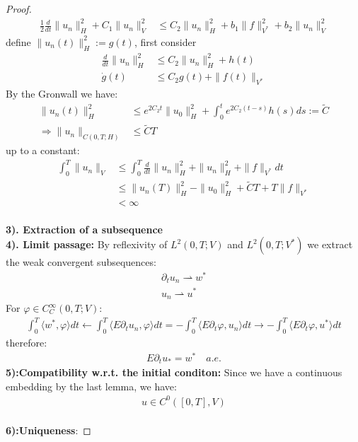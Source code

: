 \begin{proof}
\begin{align*}
 	\frac{1}{2}\frac{d}{dt} \|u_n\|_H^2 + C_1 \|u_n\|_V^2 &\le C_2 \|u_n\|_H^2 + b_1 \|f\|_{V^*}^2 + b_2 \|u_n\|_V^2
 \end{align*}
 define $\|u_n(t)\|_H^2 := g(t)$,  first consider
 \begin{align*}
 	 \frac{d}{dt} \|u_n\|_H^2 &\le C_2 \|u_n\|_H^2 + h(t)  \\ 
 	\dot{g}(t)  &\le C_2g(t) + \|f(t)\|_{V^*}
 \end{align*}
 By the Gronwall we have:
 \begin{align*}
 	\|u_n(t)\|_H^2 &\le e^{2C_2 t} \|u_0\|_H^2 + \int_0^t e^{2 C_2(t - s)}h(s)ds := \tilde{C}\\
 	\Rightarrow \|u_n\|_{C(0, T; H)} &\le \tilde{C}T
 \end{align*}
 up to a constant:
 \begin{align*}
 	\int_0^T \|u_n\|_V &\le \int_0^T \frac{d}{dt}\|u_n\|_H^2 + \|u_n\|_H^2 + \|f\|_{V^*} dt \\
 	&\le \|u_n(T)\|_H^2 - \|u_0\|_H^2 + \tilde{C}T + T\|f\|_{V^*}\\
 	&< \infty
 \end{align*}
 \\
 \textbf{3). Extraction of a subsequence}
 \\
 \textbf{4). Limit passage:}
 By reflexivity of $L^2(0, T;V)$ and $L^2(0, T; V^*)$ we extract the weak convergent subsequences:
 \begin{align*}
 \partial_t u_n \rightharpoonup w^*\\
 	u_n \rightharpoonup u^*
 \end{align*}
 For $\varphi \in C_C^\infty(0, T;V)$:
 \begin{align*}
 	\int_0^T \langle w^*, \varphi \rangle dt 
 	\leftarrow
 	\int_0^T \langle E\partial_t u_n, \varphi \rangle dt = -\int_0^T \langle E\partial_t \varphi, u_n \rangle dt \rightarrow -\int_0^T \langle E\partial_t\varphi, u^* \rangle dt
 \end{align*}
 therefore:
 \begin{align*}
 	E\partial_t u_* = w^* \quad a.e. 
 \end{align*}
 \textbf{5):Compatibility w.r.t. the initial conditon: } Since we have a continuous embedding by the last lemma, we have:
 \begin{align*}
 	u \in C^0([0, T], V)
 \end{align*}
 \quad\\
 \textbf{6):Uniqueness}:	
 \end{proof}
 
